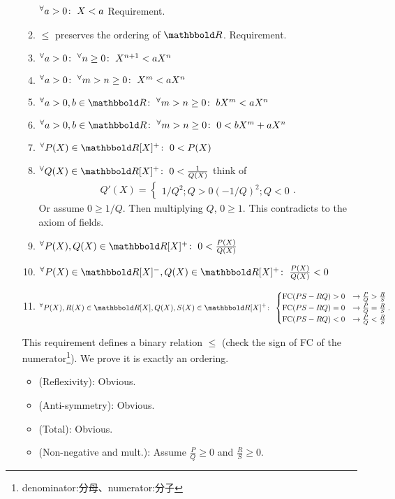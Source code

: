 \documentclass[9pt]{ltjsarticle}
\begin{document}
\begin{itemize}
\begin{enumerate}
    ${}^{\forall}{a>0}\mathrm{\colon\;} X<a$ \pf Requirement.
    \item
    $\le$ preserves the ordering of $\R$. \pf Requirement.
    \item
    ${}^{\forall}{a>0}\mathrm{\colon\;} {}^{\forall}{n\ge 0}\mathrm{\colon\;}X^{n+1} < aX^{n}$
    \item
    ${}^{\forall}{a>0}\mathrm{\colon\;}{}^{\forall}{m>n\ge 0}\mathrm{\colon\;} X^m < aX^n$
    \item
    $\Forall{a>0,b\in \R}\Forall{m>n\ge 0} bX^m < aX^n$
    \item
    $\Forall{a>0,b\in \R}\Forall{m>n\ge 0} 0<bX^m + aX^n$
    \item
    $\Forall{P(X) \in \R [X]^+} 0 < P(X)$
    \item
    $\Forall{Q(X)\in \R [X]^+} 0 < \frac{1}{Q(X)}$
    \pf
    think of
    \begin{align}
      Q'(X) =
      \begin{cases}
        1/Q^2 ; Q>0
        (-1/Q)^2; Q<0
      \end{cases}.
    \end{align}
    Or assume $0 \ge 1/Q$.  Then multiplying $Q$, $0\ge 1$.
    This contradicts to the axiom of fields.
    \item
    $\Forall{P(X),Q(X)\in \R [X]^+} 0 < \frac{P(X)}{Q(X)}$
    \item
    $\Forall{P(X)\in \R [X]^-,Q(X)\in \R [X]^+} \frac{P(X)}{Q(X)} < 0$
    \item
    \begin{align}
    \Forall{P(X),R(X)\in \R [X], Q(X),S(X)\in \R [X]^+}
    \begin{cases}
      \FC(PS-RQ)>0 &\rightarrow \frac{P}{Q} > \frac{R}{S}\\
      \FC(PS-RQ)=0 &\rightarrow \frac{P}{Q} = \frac{R}{S}\\
      \FC(PS-RQ)<0 & \rightarrow \frac{P}{Q} < \frac{R}{S}
    \end{cases}.
    \end{align}
  \end{enumerate}
  This requirement defines a binary relation $\le$ (check the sign of FC of the numerator\footnote{denominator:分母、numerator:分子}).
  We prove it is exactly an ordering.
  \begin{itemize}
    \item (Reflexivity): Obvious.
    \item (Anti-symmetry): Obvious.
    \item (Total): Obvious.
    \item (Non-negative and mult.):
    Assume $\frac{P}{Q}\ge 0$ and $\frac{R}{S}\ge 0$.

\end{itemize}
\end{itemize}
\end{document}
